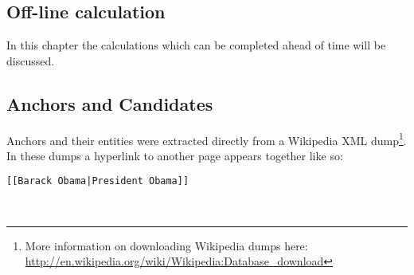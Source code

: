 \documentclass[runningheads,a4paper]{llncs}
\begin{document}
\subsection{Off-line calculation}\label{sec:offlineCalc}
In this chapter the calculations which can be completed ahead of time will be discussed.

\subsection{Anchors and Candidates}\label{sec:candidatesAndAnchors}
Anchors and their entities were extracted directly from a Wikipedia XML dump\footnote{More information on downloading Wikipedia dumps here: \url{http://en.wikipedia.org/wiki/Wikipedia:Database_download}}. In these dumps a hyperlink to another page appears together like so:\\
\centerline{\tt{[[Barack Obama|President Obama]]}}\\
\end{document}
